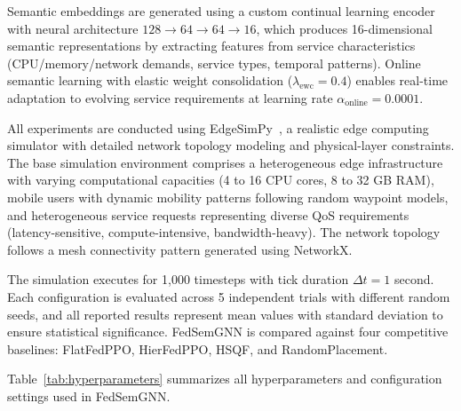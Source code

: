 \documentclass[conference]{IEEEtran}
\begin{document}
	Semantic embeddings are generated using a custom continual learning encoder with neural architecture $128 \rightarrow 64 \rightarrow 64 \rightarrow 16$, which produces 16-dimensional semantic representations by extracting features from service characteristics (CPU/memory/network demands, service types, temporal patterns). Online semantic learning with elastic weight consolidation ($\lambda_{\text{ewc}} = 0.4$) enables real-time adaptation to evolving service requirements at learning rate $\alpha_{\text{online}} = 0.0001$.
	
	All experiments are conducted using EdgeSimPy~\cite{edgesimpy}, a realistic edge computing simulator with detailed network topology modeling and physical-layer constraints. The base simulation environment comprises a heterogeneous edge infrastructure with varying computational capacities (4 to 16 CPU cores, 8 to 32 GB RAM), mobile users with dynamic mobility patterns following random waypoint models, and heterogeneous service requests representing diverse QoS requirements (latency-sensitive, compute-intensive, bandwidth-heavy). The network topology follows a mesh connectivity pattern generated using NetworkX.
	
	The simulation executes for 1,000 timesteps with tick duration $\Delta t = 1$ second. Each configuration is evaluated across 5 independent trials with different random seeds, and all reported results represent mean values with standard deviation to ensure statistical significance. FedSemGNN is compared against four competitive baselines: FlatFedPPO, HierFedPPO, HSQF, and RandomPlacement.
	
	Table~\ref{tab:hyperparameters} summarizes all hyperparameters and configuration settings used in FedSemGNN.
	
\end{document}
